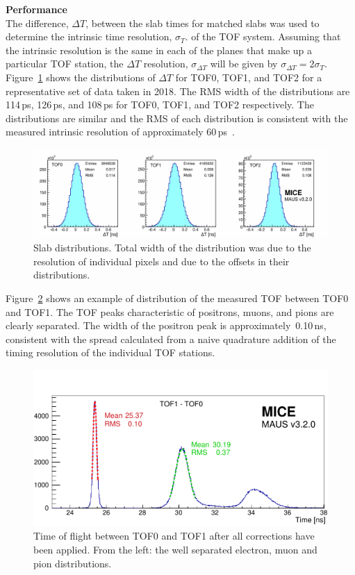 \noindent\textbf{Performance} \\
\noindent
The difference, $\Delta T$, between the slab times for matched slabs
was used to determine the intrinsic time resolution, $\sigma_T$. of the
TOF system.
Assuming that the intrinsic resolution is the same in each of the
planes that make up a particular TOF station, the $\Delta T$
resolution, $\sigma_{\Delta T}$ will be given by
$\sigma_{\Delta T}=2\sigma_T$.
Figure~\ref{fig:SlabDtAll} shows the distributions of $\Delta T$ for
TOF0, TOF1, and TOF2 for a representative set of data taken in 2018.
The RMS width of the distributions are 114\,ps, 126\,ps, and 108\,ps
for TOF0, TOF1, and TOF2 respectively.
The distributions are similar and the RMS of each distribution is
consistent with the measured intrinsic resolution of approximately
60\,ps~\cite{2010NIMPA.615...14B}.
\begin{figure}
  \begin{center}
    \includegraphics[width=0.9\columnwidth]{07_overall_slab_dt_edited}
  \end{center}
  \caption{
    Slab \DT{} distributions.
    Total width of the distribution was due to the resolution of
    individual pixels and due to the offsets in their \DT{}
    distributions.
  }
  \label{fig:SlabDtAll}
\end{figure}

Figure~\ref{fig:TOF_peaks} shows an example of distribution of the
measured TOF between TOF0 and TOF1.
The TOF peaks characteristic of positrons, muons, and pions are
clearly separated.
The width of the positron peak is approximately~0.10\,ns,
consistent with the spread calculated from a naive quadrature addition
of the timing resolution of the individual TOF stations.
\begin{figure}
  \begin{center}
    \includegraphics[width=0.6\columnwidth]{TOF_peaks.pdf}
  \end{center}
  \caption{
    Time of flight between TOF0 and TOF1 after all corrections have
    been applied. From the left: the well separated electron, muon and
    pion distributions.
  } 
  \label{fig:TOF_peaks}
\end{figure}
